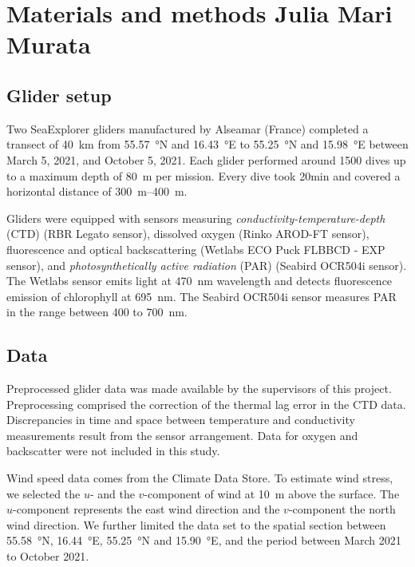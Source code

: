 \documentclass[../Main.tex]{subfiles}
\begin{document}
\section*{\crule[blue]{.3cm}{.3cm} Materials and methods \scriptsize{Julia Mari Murata}}
\subsection*{\crule[blue]{.2cm}{.2cm} Glider setup}
Two SeaExplorer gliders manufactured by Alseamar (France) completed a transect of \SI{40}{km} from \SI{55.57}{\degree}N and \SI{16.43}{\degree}E to \SI{55.25}{\degree}N and \SI{15.98}{\degree}E between March 5, 2021, and October 5, 2021. 
Each glider performed around 1500 dives up to a maximum depth of \SI{80}{m} per mission. 
Every dive took 20min and covered a horizontal distance of \SIrange{300}{400}{m}. 
 
Gliders were equipped with sensors measuring \emph{conductivity-temperature-depth} (CTD) (RBR Legato sensor), dissolved oxygen (Rinko AROD-FT sensor), fluorescence and optical backscattering (Wetlabs ECO Puck FLBBCD - EXP sensor), and \emph{photosynthetically active radiation} (PAR) (Seabird OCR504i sensor). 
The Wetlabs sensor emits light at \SI{470}{nm} wavelength and detects fluorescence emission of chlorophyll at \SI{695}{nm}. 
The Seabird OCR504i sensor measures PAR in the range between 400 to \SI{700}{nm}.\supercite{ACSA2014}

\subsection*{\crule[blue]{.2cm}{.2cm} Data}
Preprocessed glider data was made available by the supervisors of this project. Preprocessing comprised the correction of the thermal lag error in the CTD data.
Discrepancies in time and space between temperature and conductivity measurements result from the sensor arrangement.\supercite{Garau2011}
Data for oxygen and backscatter were not included in this study.

Wind speed data comes from the Climate Data Store.\supercite{era} 
To estimate wind stress, we selected the $u$- and the $v$-component of wind at \SI{10}{m} above the surface. 
The $u$-component represents the east wind direction and the $v$-component the north wind direction.\supercite{era2} 
We further limited the data set to the spatial section between \SI{55.58}{\degree}N, \SI{16.44}{\degree}E, \SI{55.25}{\degree}N and \SI{15.90}{\degree}E, and the period between March 2021 to October 2021. 
\end{document}
